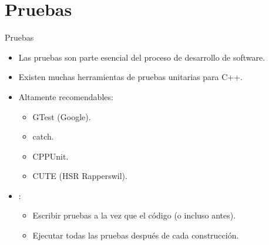 \section{Pruebas}

\begin{frame}[t]{Pruebas}
\begin{itemize}
  \item Las pruebas son parte esencial del proceso de desarrollo de software.
  \item Existen muchas herramientas de pruebas unitarias para C++.
  \item Altamente recomendables:
    \begin{itemize}
      \item GTest (Google).
      \item catch.
      \item CPPUnit.
      \item CUTE (HSR Rapperswil).
    \end{itemize}

  \item {}:
    \begin{itemize}
      \item Escribir pruebas a la vez que el código (o incluso antes).
      \item Ejecutar todas las pruebas después de cada construcción.
    \end{itemize}
\end{itemize}
\end{frame}


